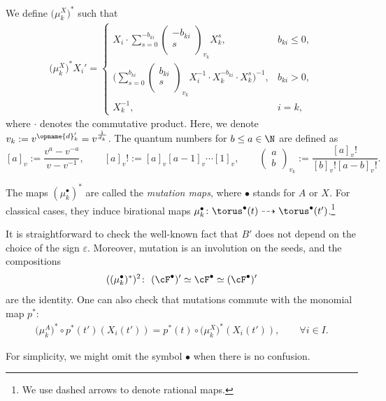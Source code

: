 \documentclass[pdftex]{sigma}
\renewcommand{\diag}{\opname{d}'}
\numberwithin{equation}{section}
\begin{document}
We define $\big(\mu_{k}^{X}\big)^{*}$ such that
\begin{align*}
 \big(\mu_{k}^{X}\big)^{*}X_{i}' =\begin{cases}
 X_{i}\cdot \displaystyle\sum_{s=0}^{-b_{ki}}\begin{pmatrix}
 -b_{ki}\\
 s\\
 \end{pmatrix}_{v_k} X_{k}^{s}, & b_{ki}\leq0,\\
 \Biggl(\displaystyle\sum_{s=0}^{b_{ki}}\begin{pmatrix}
 b_{ki}\\
 s\\
 \end{pmatrix}_{v_k} X_{i}^{-1}\cdot X_{k}^{-b_{ki}} \cdot X_{k}^{s} \Biggr)^{-1},& b_{ki}>0,\\
 X_{k}^{-1}, & i=k,
 \end{cases}
 \end{align*}
where $\cdot$ denotes the commutative product. Here, we denote $v_k:=v^{\diag_{k}}=v^{\frac{1}{d_k}}$. The quantum numbers for $b\leq a \in \N$ are defined as
\[[a]_v:=\frac{v^a-v^{-a}}{v-v^{-1}},\qquad [a]_v!:=[a]_v[a-1]_{v}\cdots [1]_v, \qquad \begin{pmatrix}
 a\\
 b \end{pmatrix}_{v_k}:=\frac{[a]_v!}{[b]_v! [a-b]_v !}.\]

The maps $(\mu_{k}^{\bullet})^{*}$ are called the \emph{mutation
maps}, where $\bullet$ stands for $A$ or $X$\emph{.} For classical cases, they induce
birational maps $\mu_{k}^{\bullet}\colon\torus^{\bullet}(t)\dashrightarrow\torus^{\bullet}(t')$.\footnote{We use dashed arrows to denote rational maps.}

It is straightforward to check the well-known fact that $B'$ does not depend on the choice of the sign $\varepsilon$. Moreover,
mutation is an involution on the seeds, and the compositions \[((\mu_{k}^{\bullet})^{*})^{2}\colon \ (\cF^{\bullet})'\simeq\cF^{\bullet}\simeq(\cF^{\bullet})'\]
are the identity. One can also check that mutations commute with the monomial map $p^*$:
\begin{align}\label{eq:X_A_mutation_commutativity}
 \big(\mu_k^A\big)^*\circ p^*(t')(X_i(t'))=p^*(t)\circ \big(\mu_k^X\big)^*(X_i(t')),\qquad \forall i\in I.
\end{align}

For simplicity, we might omit the symbol $\bullet$ when there is
no confusion.
\end{document}
